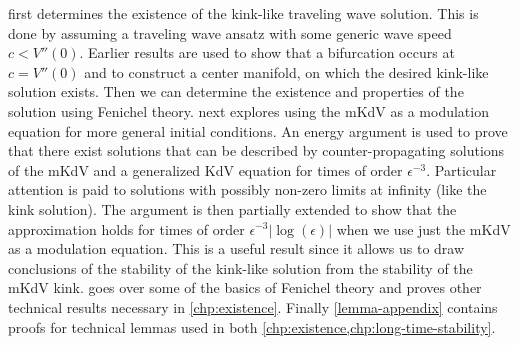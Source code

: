  first determines the existence of the kink-like traveling wave solution. This is done by assuming a traveling wave ansatz with some generic wave speed \(c<V''(0)\). Earlier results are used to show that a bifurcation occurs at \(c = V''(0)\) and to construct a center manifold, on which the desired kink-like solution exists. Then we can determine the existence and properties of the solution using Fenichel theory.  next explores using the mKdV as a modulation equation for more general initial conditions. An energy argument is used to prove that there exist solutions that can be described by counter-propagating solutions of the mKdV and a generalized KdV equation for times of order \(\epsilon^{-3}\). Particular attention is paid to solutions with possibly non-zero limits at infinity (like the kink solution). The argument is then partially extended to show that the approximation holds for times of order \(\epsilon^{-3}|\log(\epsilon)|\) when we use just the mKdV as a modulation equation. This is a useful result since it allows us to draw conclusions of the stability of the kink-like solution from the stability of the mKdV kink.  goes over some of the basics of Fenichel theory and proves other technical results necessary in \cref{chp:existence}. Finally \cref{lemma-appendix} contains proofs for technical lemmas used in both \cref{chp:existence,chp:long-time-stability}.